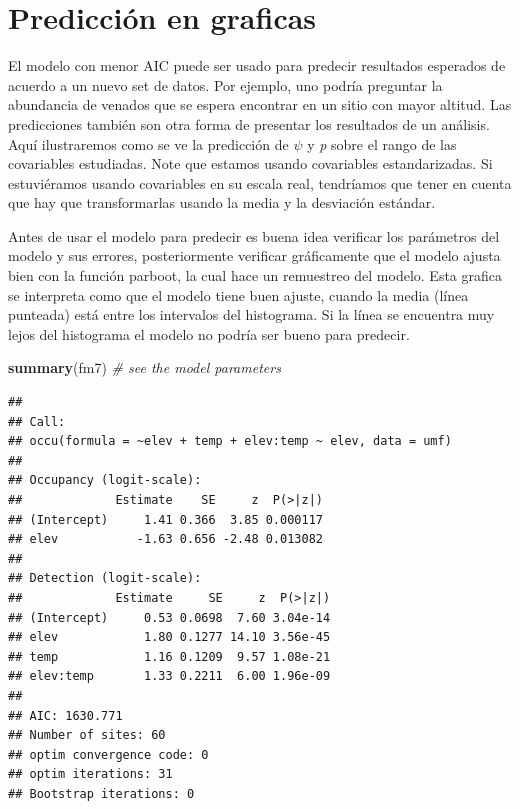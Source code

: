 \documentclass[
]{book}
\newenvironment{Shaded}{\begin{snugshade}}{\end{snugshade}}
\newcommand{\CommentTok}[1]{\textcolor[rgb]{0.56,0.35,0.01}{\textit{#1}}}
\newcommand{\KeywordTok}[1]{\textcolor[rgb]{0.13,0.29,0.53}{\textbf{#1}}}
\newcommand{\NormalTok}[1]{#1}
\begin{document}
\hypertarget{predicciuxf3n-en-graficas}{%
\section{Predicción en graficas}\label{predicciuxf3n-en-graficas}}

El modelo con menor AIC puede ser usado para predecir resultados esperados de acuerdo a un nuevo set de datos. Por ejemplo, uno podría preguntar la abundancia de venados que se espera encontrar en un sitio con mayor altitud. Las predicciones también son otra forma de presentar los resultados de un análisis. Aquí ilustraremos como se ve la predicción de \(\psi\) y \emph{p} sobre el rango de las covariables estudiadas. Note que estamos usando covariables estandarizadas. Si estuviéramos usando covariables en su escala real, tendríamos que tener en cuenta que hay que transformarlas usando la media y la desviación estándar.

Antes de usar el modelo para predecir es buena idea verificar los parámetros del modelo y sus errores, posteriormente verificar gráficamente que el modelo ajusta bien con la función parboot, la cual hace un remuestreo del modelo. Esta grafica se interpreta como que el modelo tiene buen ajuste, cuando la media (línea punteada) está entre los intervalos del histograma. Si la línea se encuentra muy lejos del histograma el modelo no podría ser bueno para predecir.

\begin{Shaded}
\begin{Highlighting}[]
\KeywordTok{summary}\NormalTok{(fm7) }\CommentTok{# see the model parameters}
\end{Highlighting}
\end{Shaded}

\begin{verbatim}
##
## Call:
## occu(formula = ~elev + temp + elev:temp ~ elev, data = umf)
##
## Occupancy (logit-scale):
##             Estimate    SE     z  P(>|z|)
## (Intercept)     1.41 0.366  3.85 0.000117
## elev           -1.63 0.656 -2.48 0.013082
##
## Detection (logit-scale):
##             Estimate     SE     z  P(>|z|)
## (Intercept)     0.53 0.0698  7.60 3.04e-14
## elev            1.80 0.1277 14.10 3.56e-45
## temp            1.16 0.1209  9.57 1.08e-21
## elev:temp       1.33 0.2211  6.00 1.96e-09
##
## AIC: 1630.771
## Number of sites: 60
## optim convergence code: 0
## optim iterations: 31
## Bootstrap iterations: 0
\end{verbatim}
\end{document}
